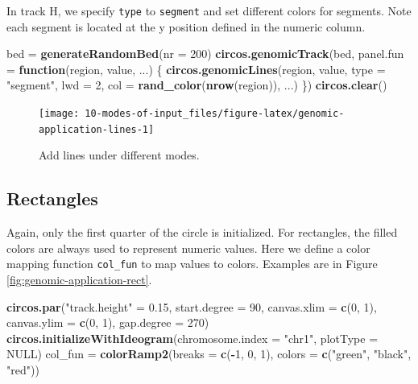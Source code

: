 \documentclass[]{book}
\newenvironment{Shaded}{\begin{snugshade}}{\end{snugshade}}
\newcommand{\KeywordTok}[1]{\textcolor[rgb]{0.13,0.29,0.53}{\textbf{#1}}}
\newcommand{\DataTypeTok}[1]{\textcolor[rgb]{0.13,0.29,0.53}{#1}}
\newcommand{\DecValTok}[1]{\textcolor[rgb]{0.00,0.00,0.81}{#1}}
\newcommand{\FloatTok}[1]{\textcolor[rgb]{0.00,0.00,0.81}{#1}}
\newcommand{\StringTok}[1]{\textcolor[rgb]{0.31,0.60,0.02}{#1}}
\newcommand{\OtherTok}[1]{\textcolor[rgb]{0.56,0.35,0.01}{#1}}
\newcommand{\ControlFlowTok}[1]{\textcolor[rgb]{0.13,0.29,0.53}{\textbf{#1}}}
\newcommand{\OperatorTok}[1]{\textcolor[rgb]{0.81,0.36,0.00}{\textbf{#1}}}
\newcommand{\NormalTok}[1]{#1}
\theoremstyle{definition}
\theoremstyle{definition}
\theoremstyle{remark}
\begin{document}
In track H, we specify \texttt{type} to \texttt{segment} and set
different colors for segments. Note each segment is located at the y
position defined in the numeric column.

\begin{Shaded}
\begin{Highlighting}[]
\NormalTok{bed =}\StringTok{ }\KeywordTok{generateRandomBed}\NormalTok{(}\DataTypeTok{nr =} \DecValTok{200}\NormalTok{)}
\KeywordTok{circos.genomicTrack}\NormalTok{(bed, }
    \DataTypeTok{panel.fun =} \ControlFlowTok{function}\NormalTok{(region, value, ...) \{}
        \KeywordTok{circos.genomicLines}\NormalTok{(region, value, }\DataTypeTok{type =} \StringTok{"segment"}\NormalTok{, }\DataTypeTok{lwd =} \DecValTok{2}\NormalTok{, }
            \DataTypeTok{col =} \KeywordTok{rand_color}\NormalTok{(}\KeywordTok{nrow}\NormalTok{(region)), ...)}
\NormalTok{\})}
\KeywordTok{circos.clear}\NormalTok{()}
\end{Highlighting}
\end{Shaded}

\begin{figure}

{\centering \texttt{[image: 10-modes-of-input\_files/figure-latex/genomic-application-lines-1]} 

}

\caption{Add lines under different modes.}\label{fig:genomic-application-lines}
\end{figure}

\subsection{Rectangles}\label{modes-rectangles}

Again, only the first quarter of the circle is initialized. For
rectangles, the filled colors are always used to represent numeric
values. Here we define a color mapping function \texttt{col\_fun} to map
values to colors. Examples are in Figure
\ref{fig:genomic-application-rect}.

\begin{Shaded}
\begin{Highlighting}[]
\KeywordTok{circos.par}\NormalTok{(}\StringTok{"track.height"}\NormalTok{ =}\StringTok{ }\FloatTok{0.15}\NormalTok{, }\DataTypeTok{start.degree =} \DecValTok{90}\NormalTok{,}
    \DataTypeTok{canvas.xlim =} \KeywordTok{c}\NormalTok{(}\DecValTok{0}\NormalTok{, }\DecValTok{1}\NormalTok{), }\DataTypeTok{canvas.ylim =} \KeywordTok{c}\NormalTok{(}\DecValTok{0}\NormalTok{, }\DecValTok{1}\NormalTok{), }\DataTypeTok{gap.degree =} \DecValTok{270}\NormalTok{)}
\KeywordTok{circos.initializeWithIdeogram}\NormalTok{(}\DataTypeTok{chromosome.index =} \StringTok{"chr1"}\NormalTok{, }\DataTypeTok{plotType =} \OtherTok{NULL}\NormalTok{)}
\NormalTok{col_fun =}\StringTok{ }\KeywordTok{colorRamp2}\NormalTok{(}\DataTypeTok{breaks =} \KeywordTok{c}\NormalTok{(}\OperatorTok{-}\DecValTok{1}\NormalTok{, }\DecValTok{0}\NormalTok{, }\DecValTok{1}\NormalTok{), }\DataTypeTok{colors =} \KeywordTok{c}\NormalTok{(}\StringTok{"green"}\NormalTok{, }\StringTok{"black"}\NormalTok{, }\StringTok{"red"}\NormalTok{))}
\end{Highlighting}
\end{Shaded}
\end{document}

